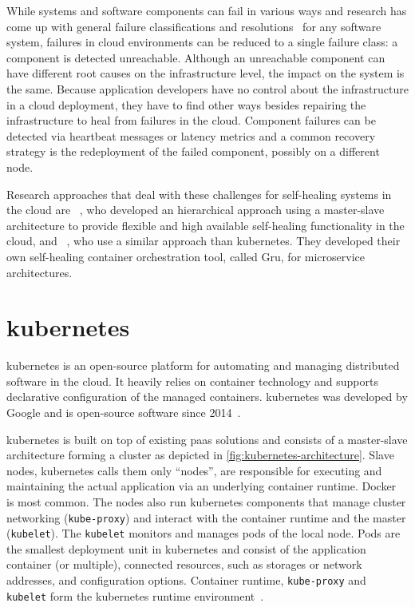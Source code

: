   While systems and software components can fail in various ways and research has come up with general failure classifications and resolutions~\cite[Tab.~1]{PsaierSurvey} for any software system, failures in cloud environments can be reduced to a single failure class: a component is detected unreachable.
  Although an unreachable component can have different root causes on the infrastructure level, the impact on the system is the same.
  Because application developers have no control about the infrastructure in a cloud deployment, they have to find other ways besides repairing the infrastructure to heal from failures in the cloud.
  Component failures can be detected via heartbeat messages or latency metrics and a common recovery strategy is the redeployment of the failed component, possibly on a different node.

  Research approaches that deal with these challenges for self-healing systems in the cloud are \citeauthor{StackCloud}~\cite{StackCloud}, who developed an hierarchical approach using a master-slave architecture to provide flexible and high available self-healing functionality in the cloud, and \citeauthor{gru}~\cite{gru}, who use a similar approach than \gls{kubernetes}.
  They developed their own self-healing container orchestration tool, called Gru, for microservice architectures.

\section[Kubernetes]{\gls{kubernetes}}\label{sec:kubernetes}
  \Gls{kubernetes} is an open-source platform for automating and managing distributed software in the cloud.
  It heavily relies on container technology and supports declarative configuration of the managed containers.
  \Gls{kubernetes} was developed by Google and is open-source software since 2014~\cite{kubernetes}.

  \Gls{kubernetes} is built on top of existing \gls{paas} solutions and consists of a master-slave architecture forming a cluster as depicted in \cref{fig:kubernetes-architecture}.
  Slave nodes, \gls{kubernetes} calls them only \enquote{nodes}, are responsible for executing and maintaining the actual application via an underlying container runtime.
  Docker~\cite{docker} is most common.
  The nodes also run \gls{kubernetes} components that manage cluster networking (\texttt{kube-proxy}) and interact with the container runtime and the master (\texttt{kubelet}).
  The \texttt{kubelet} monitors and manages pods of the local node.
  Pods are the smallest deployment unit in \gls{kubernetes} and consist of the application container (or multiple), connected resources, such as storages or network addresses, and configuration options.
  Container runtime, \texttt{kube-proxy} and \texttt{kubelet} form the \gls{kubernetes} runtime environment~\cite{kubernetesdoc}.

